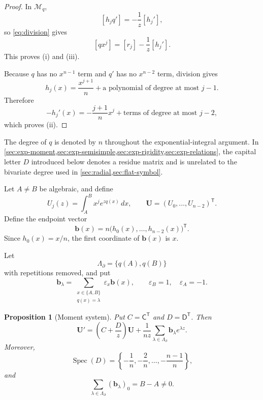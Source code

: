 \documentclass[11pt]{article}
\numberwithin{equation}{section}
\newtheorem{proposition}[proposition]{Proposition}
\theoremstyle{definition}
\theoremstyle{remark}
\newcommand{\Spec}{\operatorname{Spec}}
\newcommand{\Mcal}{\mathcal M}
\begin{document}
\begin{proof}
In $\Mcal_q$,
\[
  [h_jq']=-\frac1z[h_j'],
\]
so \eqref{eq:division} gives
\[
  [qx^j]=[r_j]-\frac1z[h_j'].
\]
This proves (i) and (iii).

Because $q$ has no $x^{n-1}$ term and $q'$ has no $x^{n-2}$ term, division gives
\[
  h_j(x)=\frac{x^{j+1}}n+
  \text{a polynomial of degree at most }j-1.
\]
Therefore
\[
  -h_j'(x)=-\frac{j+1}{n}x^j+
  \text{terms of degree at most }j-2,
\]
which proves (ii).
\end{proof}

The degree of $q$ is denoted by $n$ throughout the exponential-integral
argument.  In \cref{sec:exp-moment,sec:exp-semisimple,sec:exp-rigidity,sec:exp-relations},
the capital letter $D$ introduced below denotes a residue matrix and is
unrelated to the bivariate degree used in \cref{sec:radial,sec:flat-symbol}.

Let $A\ne B$ be algebraic, and define
\begin{equation}\label{eq:Uj}
  U_j(z)=\int_A^B x^j e^{zq(x)}\,dx,
  \qquad
  \mathbf U=(U_0,\ldots,U_{n-2})^{\mathsf T}.
\end{equation}
Define the endpoint vector
\begin{equation}\label{eq:b-x}
  \mathbf b(x)=n\bigl(h_0(x),\ldots,h_{n-2}(x)\bigr)^{\mathsf T}.
\end{equation}
Since $h_0(x)=x/n$, the first coordinate of $\mathbf b(x)$ is $x$.

Let
\[
  \Lambda_{\partial}=\{q(A),q(B)\}
\]
with repetitions removed, and put
\begin{equation}\label{eq:b-lambda}
  \mathbf b_\lambda
  =\sum_{\substack{x\in\{A,B\}\\q(x)=\lambda}}
  \varepsilon_x\mathbf b(x),
  \qquad
  \varepsilon_B=1,
  \quad \varepsilon_A=-1.
\end{equation}

\begin{proposition}[Moment system]\label{prop:moment-system}
Put $C=\mathsf C^{\mathsf T}$ and $D=\mathsf D^{\mathsf T}$.  Then
\begin{equation}\label{eq:moment-system}
  \mathbf U'
  =\left(C+\frac Dz\right)\mathbf U
  +\frac1{nz}\sum_{\lambda\in\Lambda_{\partial}}
  \mathbf b_\lambda e^{\lambda z}.
\end{equation}
Moreover,
\begin{equation}\label{eq:D-spectrum}
  \Spec(D)=
  \left\{-\frac1n,-\frac2n,\ldots,-\frac{n-1}{n}\right\},
\end{equation}
and
\begin{equation}\label{eq:block-sum}
  \sum_{\lambda\in\Lambda_{\partial}}
  (\mathbf b_\lambda)_0=B-A\ne0.
\end{equation}
\end{proposition}
\end{document}
